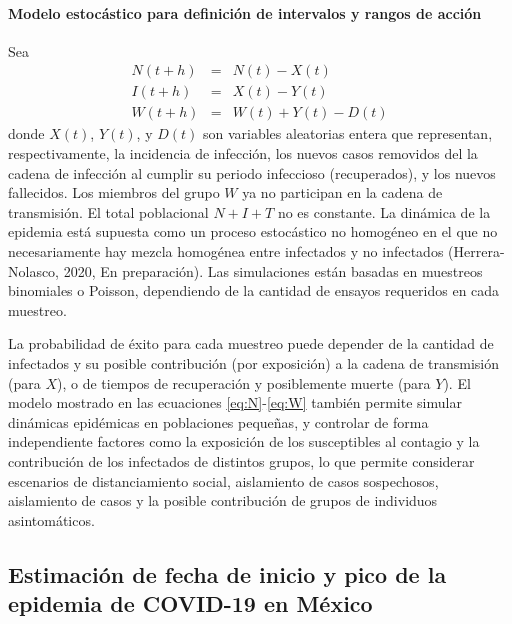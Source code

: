 \documentclass[8pt]{article}
\begin{document}
\paragraph{Modelo estocástico para definición de intervalos y rangos de acción}
Sea 
\begin{eqnarray}
N(t+h) &=& N(t) - X(t)
 \label{eq:N} \\
I(t+h) &=& X(t) - Y(t)
\label{eq:I}\\
W(t+h) &=& W(t) + Y(t) - D(t)
\label{eq:W}
\end{eqnarray}
donde $X(t)$, $Y(t)$, y $D(t)$ son variables aleatorias entera que representan, respectivamente, la incidencia de infección, los nuevos casos removidos del la cadena de infección al cumplir su periodo infeccioso (recuperados), y los nuevos fallecidos. Los miembros del grupo $W$ ya no participan en la cadena de transmisión. El total poblacional $N+I+T$ no es constante. La dinámica de la epidemia está supuesta como un proceso estocástico no homogéneo en el que no necesariamente hay mezcla homogénea entre infectados y no infectados (Herrera-Nolasco, 2020, En preparación). Las simulaciones están basadas en muestreos binomiales o Poisson, dependiendo de la cantidad de ensayos requeridos en cada muestreo.

 La probabilidad de éxito para cada muestreo puede depender de la cantidad de infectados y su posible contribución (por exposición) a la cadena de transmisión (para $X$), o de tiempos de recuperación y posiblemente muerte (para $Y$). El modelo mostrado en las ecuaciones \eqref{eq:N}-\eqref{eq:W} también permite simular dinámicas epidémicas en poblaciones pequeñas, y controlar de forma independiente  factores como la exposición de los susceptibles al contagio y la contribución de los infectados de distintos grupos, lo que permite considerar escenarios de distanciamiento social, aislamiento de casos sospechosos, aislamiento de casos y la posible contribución de grupos de individuos asintomáticos.





\subsection*{Estimación de fecha de inicio y pico de la epidemia de COVID-19 en México}
\end{document}
